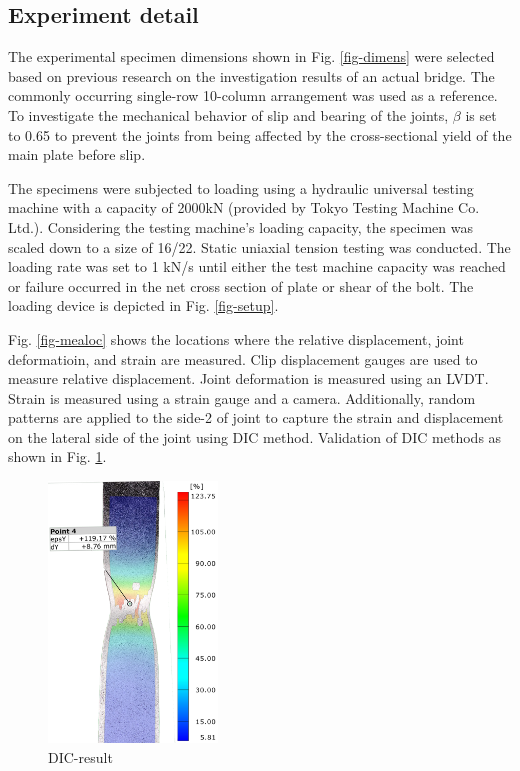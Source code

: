 \subsection{Experiment detail}

The experimental specimen dimensions shown in Fig. \ref{fig-dimens} were selected based on previous research\cite{KAMEI2000} on the investigation results of an actual bridge. The commonly occurring single-row 10-column arrangement was used as a reference. To investigate the mechanical behavior of slip and bearing of the joints, $\beta$ is set to 0.65 to prevent the joints from being affected by the cross-sectional yield of the main plate before slip.

The specimens were subjected to loading using a hydraulic universal testing machine with a capacity of 2000kN (provided by Tokyo Testing Machine Co. Ltd.). Considering the testing machine's loading capacity, the specimen was scaled down to a size of 16/22. Static uniaxial tension testing was conducted. The loading rate was set to 1 kN/s until either the test machine capacity was reached or failure occurred in the net cross section of plate or shear of the bolt. The loading device is depicted in Fig. \ref{fig-setup}.

Fig. \ref{fig-mealoc} shows the locations where the relative displacement, joint deformatioin, and strain are measured. Clip displacement gauges are used to measure relative displacement. Joint deformation is measured using an LVDT. Strain is measured using a strain gauge and a camera. Additionally, random patterns are applied to the side-2 of joint to capture the strain and displacement on the lateral side of the joint using \ac{DIC} method. Validation of \ac{DIC} methods as shown in Fig. \ref{fig-dicresult}.

\begin{figure}[htbp]
    \centering
    \includegraphics[width=0.4\textwidth]{imgs/ch6/DIC-RESULT.jpg}
    \caption{DIC-result}
    \label{fig-dicresult}
\end{figure}


